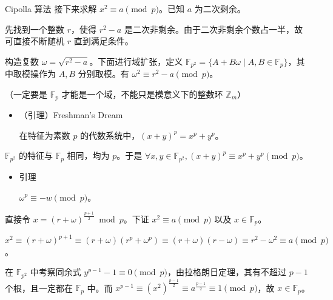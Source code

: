 \documentclass [hyperref={bookmarksdepth=4}, aspectratio=169] {beamer}
\theoremstyle {fy}
\def\Z{\mathbb{Z}}
\begin{document}
\begin{frame}{Cipolla 算法}
接下来求解 $x^2\equiv a\pmod p$。已知 $a$ 为二次剩余。

先找到一个整数 $r$，使得 $r^2-a$ 是二次非剩余。由于二次非剩余个数占一半，故可直接不断随机 $r$ 直到满足条件。

构造复数 $\omega=\sqrt{r^2-a}$。下面进行域扩张，定义 $\mathbb{F}_{p^2}=\{A+B\omega\mid A,B\in\mathbb{F}_p \}$，其中取模操作为 $A,B$ 分别取模。有 $\omega^2\equiv r^2-a\pmod p$。

（一定要是 $\mathbb{F}_{p}$ 才能是一个域，不能只是模意义下的整数环 $\Z_m$）

\begin{itemize}
    \item （引理）Freshman's Dream

  在特征为素数 $p$ 的代数系统中，$(x+y)^p=x^p+y^p$。
\end{itemize}

$\mathbb{F}_{p^2}$ 的特征与 $\mathbb{F}_p$ 相同，均为 $p$。于是 $\forall x,y\in \mathbb{F}_{p^2},(x+y)^p\equiv x^p+y^p\pmod p$。

\begin{itemize}
    \item 引理

  $\omega^p\equiv -w\pmod p$。
\end{itemize}

直接令 $x=(r+\omega)^{\frac{p+1}{2}}\bmod p$。下证 $x^2\equiv a\pmod p$ 以及 $x\in\mathbb{F}_p$。

$x^2\equiv (r+\omega)^{p+1}\equiv (r+\omega)(r^p+\omega^p)\equiv(r+\omega)(r-\omega)\equiv r^2-\omega^2\equiv a\pmod p$。

在 $\mathbb{F}_{p^2}$ 中考察同余式 $y^{p-1}-1\equiv 0\pmod p$，由拉格朗日定理，其有不超过 $p-1$ 个根，且一定都在 $\mathbb{F}_p$ 中。而 $x^{p-1}\equiv (x^2)^{\frac{p-1}{2}}\equiv a^{\frac{p-1}{2}}\equiv 1\pmod p$，故 $x\in\mathbb{F}_p$。
\end{frame}
\end{document}
